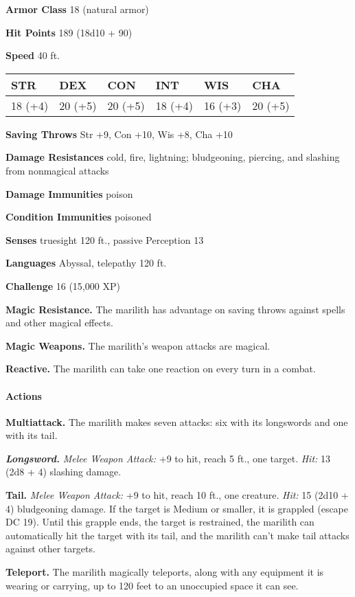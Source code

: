 \documentclass[
]{article}
\begin{document}
\textbf{Armor Class} 18 (natural armor)

\textbf{Hit Points} 189 (18d10 + 90)

\textbf{Speed} 40 ft.

\begin{longtable}[]{@{}llllll@{}}
\toprule
STR & DEX & CON & INT & WIS & CHA\tabularnewline
\midrule
\endhead
18 (+4) & 20 (+5) & 20 (+5) & 18 (+4) & 16 (+3) & 20 (+5)\tabularnewline
\bottomrule
\end{longtable}

\textbf{Saving Throws} Str +9, Con +10, Wis +8, Cha +10

\textbf{Damage Resistances} cold, fire, lightning; bludgeoning,
piercing, and slashing from nonmagical attacks

\textbf{Damage Immunities} poison

\textbf{Condition Immunities} poisoned

\textbf{Senses} truesight 120 ft., passive Perception 13

\textbf{Languages} Abyssal, telepathy 120 ft.

\textbf{Challenge} 16 (15,000 XP)

\textbf{Magic Resistance.} The marilith has advantage on saving throws
against spells and other magical effects.

\textbf{Magic Weapons.} The marilith's weapon attacks are magical.

\textbf{Reactive.} The marilith can take one reaction on every turn in a
combat.

\hypertarget{actions-5}{%
\paragraph{Actions}\label{actions-5}}

\textbf{Multiattack.} The marilith makes seven attacks: six with its
longswords and one with its tail.

\emph{\textbf{Longsword.}} \emph{Melee Weapon Attack:} +9 to hit, reach
5 ft., one target. \emph{Hit:} 13 (2d8 + 4) slashing damage.

\textbf{Tail.} \emph{Melee Weapon Attack:} +9 to hit, reach 10 ft., one
creature. \emph{Hit:} 15 (2d10 + 4) bludgeoning damage. If the target is
Medium or smaller, it is grappled (escape DC 19). Until this grapple
ends, the target is restrained, the marilith can automatically hit the
target with its tail, and the marilith can't make tail attacks against
other targets.

\textbf{Teleport.} The marilith magically teleports, along with any
equipment it is wearing or carrying, up to 120 feet to an unoccupied
space it can see.
\end{document}
